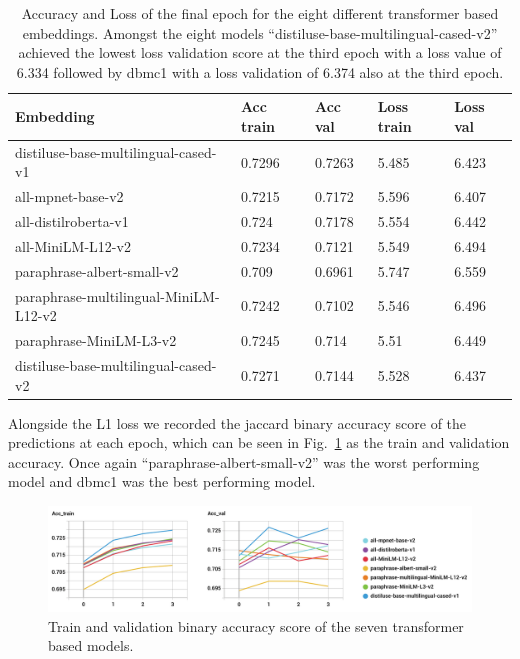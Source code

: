 \begin{table}[]
\begin{tabular}{lllll}
\multicolumn{1}{l|}{Embedding}                             & Acc train & Acc val & Loss train & Loss val \\ \hline
\multicolumn{1}{l|}{distiluse-base-multilingual-cased-v1}  & 0.7296    & 0.7263  & 5.485      & 6.423    \\
\multicolumn{1}{l|}{all-mpnet-base-v2}                     & 0.7215    & 0.7172  & 5.596      & 6.407    \\
\multicolumn{1}{l|}{all-distilroberta-v1}                  & 0.724     & 0.7178  & 5.554      & 6.442    \\
\multicolumn{1}{l|}{all-MiniLM-L12-v2}                     & 0.7234    & 0.7121  & 5.549      & 6.494    \\
\multicolumn{1}{l|}{paraphrase-albert-small-v2}            & 0.709     & 0.6961  & 5.747      & 6.559    \\
\multicolumn{1}{l|}{paraphrase-multilingual-MiniLM-L12-v2} & 0.7242    & 0.7102  & 5.546      & 6.496    \\
\multicolumn{1}{l|}{paraphrase-MiniLM-L3-v2}               & 0.7245    & 0.714   & 5.51       & 6.449    \\
\multicolumn{1}{l|}{distiluse-base-multilingual-cased-v2}  & 0.7271    & 0.7144  & 5.528      & 6.437
\end{tabular}
\caption{Accuracy and Loss of the final epoch for the eight different transformer based embeddings. Amongst the eight models ``distiluse-base-multilingual-cased-v2'' achieved the lowest loss validation score at the third epoch with a loss value of 6.334 followed by dbmc1 with a loss validation of 6.374 also at the third epoch.}
\label{table:8}
\end{table}


Alongside the L1 loss we recorded the jaccard binary accuracy score of the predictions at each epoch, which can be seen in Fig.~\ref{7acc} as the train and validation accuracy.
Once again ``paraphrase-albert-small-v2'' was the worst performing model and dbmc1 was the best performing model. 


\begin{figure}[!ht]
\centerline{\includegraphics[width=1.1\textwidth]{figuras/7embeddings_transformer_-ACC.png}   }
\caption{Train and validation binary accuracy score of the seven transformer based models.}
\label{7acc}
\end{figure}

